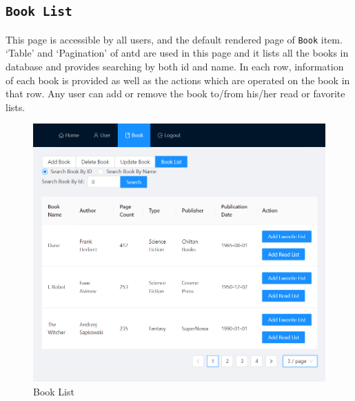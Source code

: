 \subsection{\texttt{Book List}}

This page is accessible by all users, and the default rendered page of \texttt{Book} item. `Table' and `Pagination' of antd are used in this page and it lists all the books in database and provides searching by both id and name. In each row, information of each book is provided as well as the actions which are operated on the book in that row. Any user can add or remove the book to/from his/her read or favorite lists.

\begin{minipage}{.49\textwidth}
  \begin{figure}[H]
    \centering
    \includegraphics[width=\linewidth]{img/front-end/book-list.png}
    \caption{Book List}
  \end{figure}
\end{minipage}
